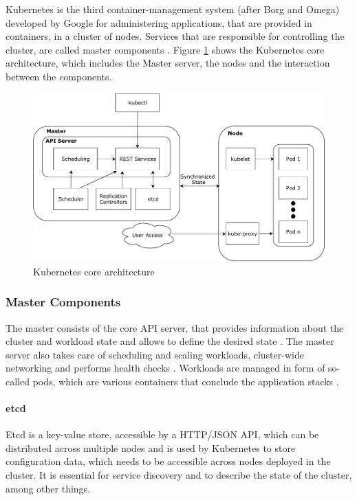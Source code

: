 Kubernetes is the third container-management system (after Borg and
Omega) developed by Google \cite{Burns:2016uq} for administering
applications, that are provided in containers, in a cluster of nodes.
Services that are responsible for controlling the cluster, are called
master components \cite{kub_intro}. Figure
\ref{kubernetes_core_architecture} shows the Kubernetes core
architecture, which includes the Master server, the nodes and the
interaction between the components.

\begin{figure}
\centering
\includegraphics[width=15.00000cm]{images/kubernetes_core_architecture}
\caption{Kubernetes core
architecture\label{kubernetes_core_architecture} \cite{baier-kub}}
\end{figure}

\subsubsection{Master Components}\label{master-components}

The master consists of the core API server, that provides information
about the cluster and workload state and allows to define the desired
state \cite{baier-kub}. The master server also takes care of scheduling
and scaling workloads, cluster-wide networking and performs health
checks \cite{kub_intro}. Workloads are managed in form of so-called
pods, which are various containers that conclude the application stacks
\cite{baier-kub}.

\paragraph{etcd}\label{etcd}

Etcd is a key-value store, accessible by a HTTP/JSON API, which can be
distributed across multiple nodes and is used by Kubernetes to store
configuration data, which needs to be accessible across nodes deployed
in the cluster. It is essential for service discovery and to describe
the state of the cluster, among other things. \cite{kub_intro}

